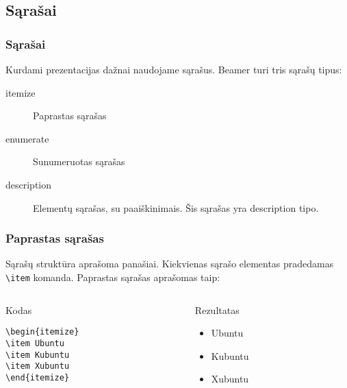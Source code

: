 \documentclass[11pt,a4paper]{beamer}
\begin{document}
\subsection{Sąrašai}
\begin{frame}
    \frametitle{Sąrašai}
    Kurdami prezentacijas dažnai naudojame sąrašus. Beamer turi tris sąrašų tipus:
    \begin{description}
        \item[itemize] Paprastas sąrašas
        \item[enumerate] Sunumeruotas sąrašas
        \item[description] Elementų sąrašas, su paaiškinimais. Šis sąrašas yra description tipo.
    \end{description}
\end{frame}
\begin{frame}[fragile]
    \frametitle{Paprastas sąrašas}
    Sąrašų struktūra aprašoma panašiai. Kiekvienas sąrašo elementas pradedamas
    \verb|\item| komanda. Paprastas sąrašas aprašomas taip:
    \begin{columns}[t]
        \begin{column}{5cm}
            \begin{block}{Kodas}
                \begin{lstlisting}
\begin{itemize}
\item Ubuntu
\item Kubuntu
\item Xubuntu 
\end{itemize}
                \end{lstlisting}
            \end{block}
        \end{column}
        \begin{column}{5cm}
            \begin{block}{Rezultatas}
                \begin{itemize}
                    \item Ubuntu
                    \item Kubuntu
                    \item Xubuntu 
                \end{itemize}
            \end{block}
        \end{column}
    \end{columns}
\end{frame}
\end{document}
